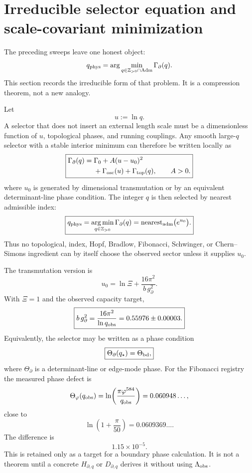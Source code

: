 \documentclass[aps,prd,reprint,nofootinbib,superscriptaddress,floatfix]{revtex4-2}
\numberwithin{equation}{section}
\theoremstyle{definition}
\theoremstyle{plain}
\begin{document}
\section{Irreducible selector equation and scale-covariant minimization}

The preceding sweeps leave one honest object:
\[
q_{\rm phys}=\arg\min_{q\in\mathbb Z_{>0}\cap{\rm Adm}}\Gamma_\partial(q).
\]
This section records the irreducible form of that problem.  It is a
compression theorem, not a new analogy.

Let
\[
u:=\ln q.
\]
A selector that does not insert an external length scale must be a
dimensionless function of \(u\), topological phases, and running
couplings.  Any smooth large-\(q\) selector with a stable interior
minimum can therefore be written locally as
\begin{equation}
\boxed{
\begin{aligned}
\Gamma_\partial(q)
={}&
\Gamma_0+A(u-u_0)^2\\
&+\Gamma_{\rm osc}(u)+\Gamma_{\rm top}(q),
\qquad A>0 .
\end{aligned}}
\end{equation}
where \(u_0\) is generated by dimensional transmutation or by an
equivalent determinant-line phase condition.  The integer \(q\) is then
selected by nearest admissible index:
\[
\boxed{
q_{\rm phys}=
\operatorname*{arg\,min}_{q\in\mathbb Z_{>0}}
\Gamma_\partial(q)
=
\operatorname{nearest}_{\rm adm}\bigl(e^{u_0}\bigr).
}
\]
Thus no topological, index, Hopf, Bradlow, Fibonacci, Schwinger, or
Chern--Simons ingredient can by itself choose the observed sector unless
it supplies \(u_0\).

The transmutation version is
\[
\boxed{
u_0
=
\ln\Xi+\frac{16\pi^2}{b\,g_\partial^2}.
}
\]
With \(\Xi=1\) and the observed capacity target,
\[
\boxed{
b\,g_\partial^2
=
\frac{16\pi^2}{\ln q_{\rm obs}}
=
0.55976\pm0.00003 .
}
\]
Equivalently, the selector may be written as a phase condition
\[
\boxed{
\Theta_{\partial}(q_\star)
=
\Theta_{\rm bd},
}
\]
where \(\Theta_{\partial}\) is a determinant-line or edge-mode phase.
For the Fibonacci registry the measured phase defect is
\[
\Theta_\varphi(q_{\rm obs})
=
\ln\!\left(\frac{\pi\varphi^{584}}{q_{\rm obs}}\right)
=
0.060948\ldots ,
\]
close to
\[
\ln\!\left(1+\frac{\pi}{50}\right)=0.0609369\ldots .
\]
The difference is
\[
1.15\times10^{-5}.
\]
This is retained only as a target for a boundary phase calculation.  It
is not a theorem until a concrete \(H_{\partial,q}\) or \(D_{\partial,q}\)
derives it without using \(\Lambda_{\rm obs}\).
\end{document}
